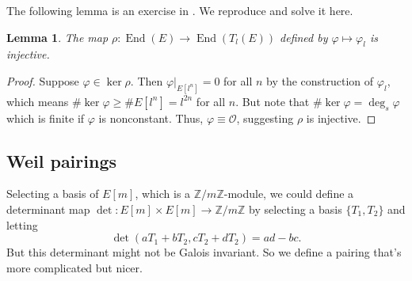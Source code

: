 \documentclass[12pt]{article}
\newtheorem{lemma}{Lemma}[subsection]
\theoremstyle{remark}
\theoremstyle{definition}
\newcommand{\Z}[0]{\mathbb{Z}}
\newcommand{\ecO}[0]{\mathcal O}
\newcommand{\End}[0]{\operatorname{End}}
\begin{document}
        The following lemma is an exercise in \cite{silverman_2009_the}. We reproduce and solve it here.
        \begin{lemma}\label{lemma-tate-map-inj}
            The map $\rho:\End(E)\to\End(T_l(E))$ defined by $\varphi\mapsto\varphi_l$ is injective.
        \end{lemma}
        \begin{proof}
            Suppose $\varphi\in\ker\rho$. Then $\left.\varphi\right|_{E[l^n]}=0$ for all $n$ by the construction of $\varphi_l$, which means $\#\ker\varphi\geqslant\#E[l^n]=l^{2n}$ for all $n$. But note that $\#\ker\varphi=\deg_s\varphi$ which is finite if $\varphi$ is nonconstant. Thus, $\varphi\equiv\ecO$, suggesting $\rho$ is injective.
        \end{proof}
        
    
    \subsection{Weil pairings}
        Selecting a basis of $E[m]$, which is a $\Z/m\Z$-module, we could define a determinant map $\det:E[m]\times E[m]\to\Z/m\Z$ by selecting a basis $\{T_1,T_2\}$ and letting
        \[\det(aT_1+bT_2, cT_2+dT_2)=ad-bc.\]
        But this determinant might not be Galois invariant. So we define a pairing that's more complicated but nicer.
        
\end{document}
